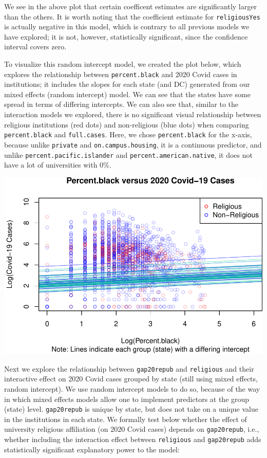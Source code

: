 \documentclass[
]{article}
\begin{document}
We see in the above plot that certain coefficent estimates are
significantly larger than the others. It is worth noting that the
coefficient estimate for \texttt{religiousYes} is actually negative in
this model, which is contrary to all previous models we have explored;
it is not, however, statistically significant, since the confidence
interval covers zero.

To visualize this random intercept model, we created the plot below,
which explores the relationship between \texttt{percent.black} and 2020
Covid cases in institutions; it includes the slopes for each state (and
DC) generated from our mixed effects (random intercept) model. We can
see that the states have some spread in terms of differing intercepts.
We can also see that, similar to the interaction models we explored,
there is no significant visual relationship between religious
institutions (red dots) and non-religious (blue dots) when comparing
\texttt{percent.black} and \texttt{full.cases}. Here, we chose
\texttt{percent.black} for the x-axis, because unlike \texttt{private}
and \texttt{on.campus.housing}, it is a continuous predictor, and unlike
\texttt{percent.pacific.islander} and \texttt{percent.american.native},
it does not have a lot of universities with 0\%.

\includegraphics{final_files/figure-latex/unnamed-chunk-36-1.pdf}

Next we explore the relationship between \texttt{gap20repub} and
\texttt{religious} and their interactive effect on 2020 Covid cases
grouped by state (still using mixed effects, random intercept). We use
random intercept models to do so, because of the way in which mixed
effects models allow one to implement predictors at the group (state)
level. \texttt{gap20repub} is unique by state, but does not take on a
unique value in the institutions in each state. We formally test below
whether the effect of university religious affiliation (on 2020 Covid
cases) depends on \texttt{gap20repub}, i.e., whether including the
interaction effect between \texttt{religious} and \texttt{gap20repub}
adds statistically significant explanatory power to the model:
\end{document}
